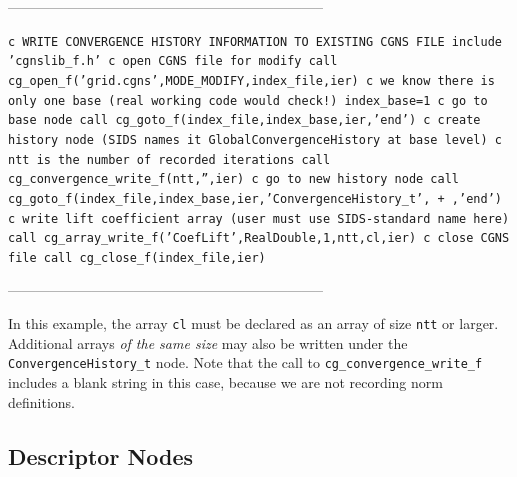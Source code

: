 \documentclass[12pt]{article}
\begin{document}
--------------------------------------------------------------------

{\tt \noindent c  WRITE CONVERGENCE HISTORY INFORMATION TO EXISTING CGNS FILE
\newline\indent      include 'cgnslib\_f.h'
\newline c  open CGNS file for modify
\newline\indent      call cg\_open\_f('grid.cgns',MODE\_MODIFY,index\_file,ier)
\newline c  we know there is only one base (real working code would check!)
\newline\indent      index\_base=1
\newline c   go to base node
\newline\indent      call cg\_goto\_f(index\_file,index\_base,ier,'end')
\newline c   create history node (SIDS names it GlobalConvergenceHistory at base level)
\newline c   ntt is the number of recorded iterations
\newline\indent      call cg\_convergence\_write\_f(ntt,'',ier)
\newline c   go to new history node
\newline\indent      call cg\_goto\_f(index\_file,index\_base,ier,'ConvergenceHistory\_t',
\newline + ,'end')
\newline c   write lift coefficient array (user must use SIDS-standard name here)
\newline\indent      call cg\_array\_write\_f('CoefLift',RealDouble,1,ntt,cl,ier)
\newline c  close CGNS file
\newline\indent      call cg\_close\_f(index\_file,ier)}

--------------------------------------------------------------------

\noindent In this example, the array {\tt cl} must be declared as 
an array of size {\tt ntt} or larger.  Additional arrays {\it of the same
size} may also be written under the {\tt ConvergenceHistory\_t}
node.  Note that the call to {\tt cg\_convergence\_write\_f}
includes a blank string in this case, because we are not recording
norm definitions.

\subsection{Descriptor Nodes} \label{sec:descript}
\end{document}
